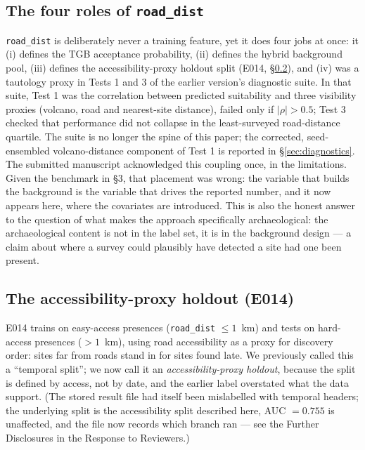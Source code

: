 \documentclass[12pt]{article}
\begin{document}
\subsection{The four roles of \texttt{road\_dist}}
\label{sec:fourroles}

\texttt{road\_dist} is deliberately never a training feature, yet it does four jobs at once: it (i) defines the TGB acceptance probability, (ii) defines the hybrid background pool, (iii) defines the accessibility-proxy holdout split (E014, \S\ref{sec:holdout}), and (iv) was a tautology proxy in Tests 1 and 3 of the earlier version's diagnostic suite.
In that suite, Test 1 was the correlation between predicted suitability and three visibility proxies (volcano, road and nearest-site distance), failed only if $|\rho| > 0.5$; Test 3 checked that performance did not collapse in the least-surveyed road-distance quartile.
The suite is no longer the spine of this paper; the corrected, seed-ensembled volcano-distance component of Test 1 is reported in \S\ref{sec:diagnostics}.
The submitted manuscript acknowledged this coupling once, in the limitations.
Given the benchmark in \S3, that placement was wrong: the variable that builds the background is the variable that drives the reported number, and it now appears here, where the covariates are introduced.
This is also the honest answer to the question of what makes the approach specifically archaeological: the archaeological content is not in the label set, it is in the background design --- a claim about where a survey could plausibly have detected a site had one been present.

\subsection{The accessibility-proxy holdout (E014)}
\label{sec:holdout}

E014 trains on easy-access presences (\texttt{road\_dist} $\leq 1$~km) and tests on hard-access presences ($>1$~km), using road accessibility as a proxy for discovery order: sites far from roads stand in for sites found late.
We previously called this a ``temporal split''; we now call it an \emph{accessibility-proxy holdout}, because the split is defined by access, not by date, and the earlier label overstated what the data support.
(The stored result file had itself been mislabelled with temporal headers; the underlying split is the accessibility split described here, AUC $= 0.755$ is unaffected, and the file now records which branch ran --- see the Further Disclosures in the Response to Reviewers.)
\end{document}
